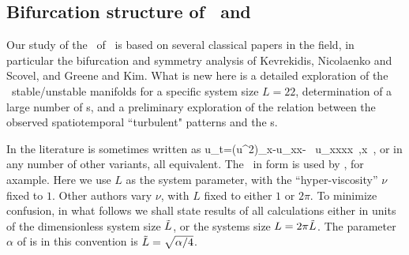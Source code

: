 \subsection{Bifurcation structure of \eqva\ and \reqva}%
\label{sec:KSlit}
%

Our study of the \eqva\ of
\KSe\ is based on several classical papers in the field,
in particular the bifurcation and symmetry analysis of
Kevrekidis, Nicolaenko and Scovel,
and Greene and Kim. What is new here is
a detailed exploration of the \eqva\ stable/unstable manifolds
for a specific system size $L = 22$, determination
of a large number of \rpo s, and a preliminary
exploration of the relation between the
observed spatiotemporal ``turbulent" patterns and
the \rpo s.



In the literature  is sometimes written as
\beq
    u_t=(u^2)_x-u_{xx}- \nu \, u_{xxxx}
    \,,\qquad   x \in [0,L]
    \,,
or in any number of other variants, all equivalent.
The \KSe\ in  form  is used by
\cite{cross93,Mks86,ks04com}, for axample.
Here we use $L$ as the system parameter, with the 
``hyper-viscosity'' $\nu$ fixed to $1$.
Other authors vary  $\nu$, with $L$ fixed to either $1$ or $2\pi$.
To minimize confusion, in what follows we shall state results of all
calculations either in units of the dimensionless system size $\tilde{L}$,
or the systems size $L = 2 \pi \tilde{L}$. The parameter $\alpha$
of  is in this convention is
$\tilde{L}=\sqrt{\alpha/4}$.


